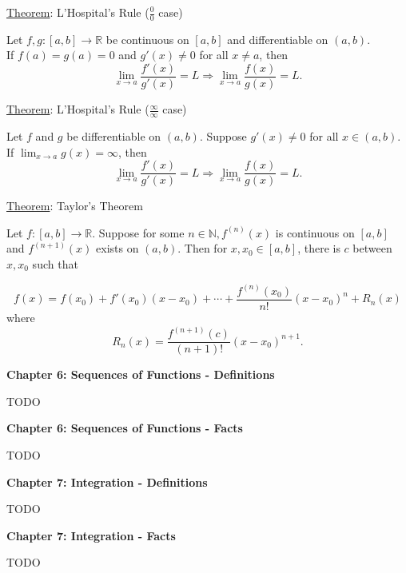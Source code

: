 \documentclass[12pt]{article}
\newcommand{\RR}{\mathbb{R}} %
\newcommand{\NN}{\mathbb{N}}
\begin{document}
\hrulefill

\underline{Theorem}: L'Hospital's Rule ($\frac{0}{0}$ case)

Let $f, g : [a, b] \rightarrow \RR$ be continuous on $[a, b]$ and differentiable on $(a, b)$.
\\
If $f(a) = g(a) = 0$ and $g'(x) \ne 0$ for all $x \ne a$, then
\[
\lim \limits_{x \rightarrow a} \frac{f'(x)}{g'(x)} = L \Rightarrow \lim \limits_{x \rightarrow a} \frac{f(x)}{g(x)} = L.
\]

\hrulefill

\underline{Theorem}: L'Hospital's Rule ($\frac{\infty}{\infty}$ case)

Let $f$ and $g$ be differentiable on $(a, b)$. Suppose $g'(x) \ne 0$ for all $x \in (a, b)$. If $\lim_{x \rightarrow a} g(x) = \infty$, then
\[
\lim \limits_{x \rightarrow a} \frac{f'(x)}{g'(x)} = L \Rightarrow \lim \limits_{x \rightarrow a} \frac{f(x)}{g(x)} = L.
\]

\pagebreak

\underline{Theorem}: Taylor's Theorem

Let $f : [a, b] \rightarrow \RR$. Suppose for some $n \in \NN, f^{(n)} (x)$ is continuous on $[a, b]$ and $f^{(n + 1)} (x)$ exists on $(a, b)$. Then for $x, x_0 \in [a, b]$, there is $c$ between $x, x_0$ such that

\[
f(x) = f(x_0) + f'(x_0)(x - x_0) + \cdots + \frac{f^{(n)} (x_0)}{n!} (x - x_0)^n + R_n (x)
\]
where
\[
R_n (x) = \frac{f^{(n + 1)} (c)}{(n + 1)!} (x - x_0)^{n + 1}.
\]

\pagebreak

\textbf{Chapter 6: Sequences of Functions - Definitions}

\hrulefill

TODO

\pagebreak

\textbf{Chapter 6: Sequences of Functions - Facts}

\hrulefill

TODO

\pagebreak

\textbf{Chapter 7: Integration - Definitions}

\hrulefill

TODO

\pagebreak

\textbf{Chapter 7: Integration - Facts}

\hrulefill

TODO

\pagebreak
\end{document}
